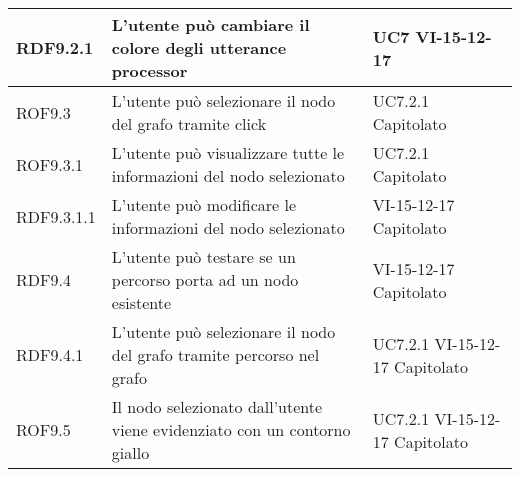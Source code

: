 \documentclass[../AnalisideiRequisiti.tex]{subfiles}
\begin{document}
\begin{longtable}{| p{3cm} | p{6cm} | p{3cm} |}
		\newline RDF9.2.1&
		\newline L'utente può cambiare il colore degli utterance processor&
		\newline UC7 \newline VI-15-12-17
		\\[1em]
		\hline
		
		\newline ROF9.3&
		\newline L'utente può selezionare il nodo del grafo tramite click&
		\newline UC7.2.1 \newline Capitolato
		\\[1em]
		\hline
		
			\newline ROF9.3.1&
		\newline L'utente può visualizzare tutte le informazioni del nodo selezionato&
		\newline UC7.2.1 \newline Capitolato
		\\[1em]
		\hline
			
		\newline RDF9.3.1.1&
		\newline L'utente può modificare le informazioni del nodo selezionato&
		\newline VI-15-12-17 \newline Capitolato
		\\[1em]
		\hline
		
		\newline RDF9.4&
		\newline L'utente può testare se un percorso porta ad un nodo esistente&
		 \newline VI-15-12-17 \newline Capitolato
		\\[1em]
		\hline
		
		\newline RDF9.4.1&
		\newline L'utente può selezionare il nodo del grafo tramite percorso nel grafo&
		\newline UC7.2.1 \newline VI-15-12-17 \newline Capitolato
		\\[1em]
		\hline
		
		\newline ROF9.5&
		\newline Il nodo selezionato dall'utente viene evidenziato con un contorno giallo&
		\newline UC7.2.1 \newline VI-15-12-17 \newline Capitolato
		\\[1em]
		\hline
		

\end{longtable}
\end{document}
